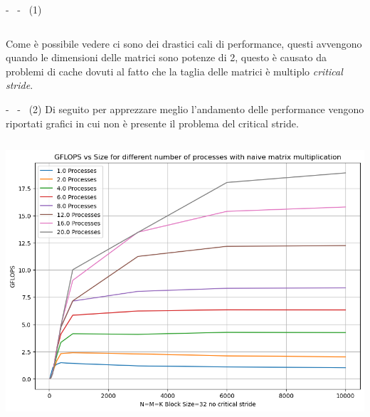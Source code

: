 \documentclass[compress]{beamer}
\begin{document}
\begin{frame}{\secname \text{ }- \subsecname\ \text{ }- \subsubsecname\ (1)}
\begin{columns}
\begin{minipage}{1\textwidth}
\begin{adjustbox}{margin=0cm 0.5cm 0cm 0cm, center}
                \end{adjustbox}
            \end{minipage}
    \end{columns}
    Come è possibile vedere ci sono dei drastici cali di performance, questi avvengono quando le dimensioni delle matrici sono potenze di 2, questo è causato da problemi di cache dovuti al fatto che la taglia delle matrici è multiplo \textit{critical stride}.
\end{frame}

\begin{frame}{\secname \text{ }- \subsecname\ \text{ }- \subsubsecname\ (2)}
    Di seguito per apprezzare meglio l'andamento delle performance vengono riportati grafici in cui non è presente il problema del critical stride.
    \begin{columns}
            \begin{minipage}{1\textwidth}
                \centering
                \begin{adjustbox}{margin=0cm 0cm 0cm 0.5cm, center} %
                    \includegraphics[width=1\textwidth, frame]{resources/square_naive_nocrit.png}
                \end{adjustbox}
            \end{minipage}
            \begin{minipage}{1\textwidth}
                \centering
                \begin{adjustbox}{margin=0cm 0cm 0cm 0.5cm, center} %

\end{adjustbox}
\end{minipage}
\end{columns}
\end{frame}
\end{document}

